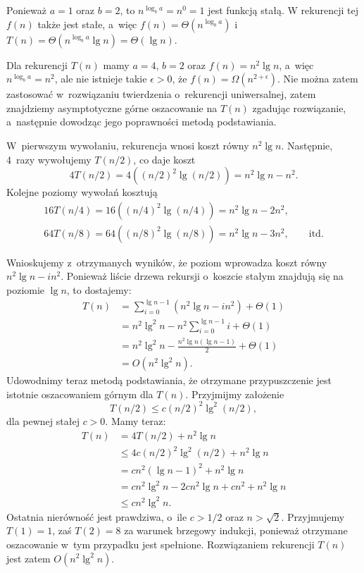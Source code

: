 \exercise %
Ponieważ $a=1$ oraz $b=2$, to $n^{\log_ba}=n^0=1$ jest funkcją stałą. W rekurencji tej $f(n)$ także jest stałe, a~więc $f(n)=\Theta(n^{\log_ba})$ i~$T(n)=\Theta(n^{\log_ba}\lg n)=\Theta(\lg n)$.

\exercise %
Dla rekurencji $T(n)$ mamy $a=4$, $b=2$ oraz $f(n)=n^2\lg n$, a~więc $n^{\log_ba}=n^2$, ale nie istnieje takie $\epsilon>0$, że $f(n)=\Omega(n^{2+\epsilon})$. Nie można zatem zastosować w~rozwiązaniu twierdzenia o~rekurencji uniwersalnej, zatem znajdziemy asymptotyczne górne oszacowanie na $T(n)$ zgadując rozwiązanie, a~następnie dowodząc jego poprawności metodą podstawiania.

W~pierwszym wywołaniu, rekurencja wnosi koszt równy $n^2\lg n$. Następnie, 4~razy wywołujemy $T(n/2)$, co daje koszt
\[
	4T(n/2) = 4((n/2)^2\lg(n/2)) = n^2\lg n-n^2.
\]
Kolejne poziomy wywołań kosztują
\begin{gather*}
	16T(n/4) = 16((n/4)^2\lg(n/4)) = n^2\lg n-2n^2, \qquad\phantom{\text{itd.}} \\
	64T(n/8) = 64((n/8)^2\lg(n/8)) = n^2\lg n-3n^2, \qquad\text{itd.}
\end{gather*}

Wnioskujemy z~otrzymanych wyników, że  poziom wprowadza koszt równy $n^2\lg n-in^2$. Ponieważ liście drzewa rekursji o~koszcie stałym znajdują się na poziomie $\lg n$, to dostajemy:
\begin{align*}
	T(n) &= \sum_{i=0}^{\lg n-1}(n^2\lg n-in^2)+\Theta(1) \\
	&= n^2\lg^2n-n^2\sum_{i=0}^{\lg n-1}i+\Theta(1) \\[1mm]
	&= n^2\lg^2n-\frac{n^2\lg n(\lg n-1)}{2}+\Theta(1) \\[1mm]
	&= O(n^2\lg^2n).
\end{align*}
Udowodnimy teraz metodą podstawiania, że otrzymane przypuszczenie jest istotnie oszacowaniem górnym dla $T(n)$. Przyjmijmy założenie
\[
	T(n/2) \le c(n/2)^2\lg^2(n/2),
\]
dla pewnej stałej $c>0$. Mamy teraz:
\begin{align*}
	T(n) &= 4T(n/2)+n^2\lg n \\
	&\le 4c(n/2)^2\lg^2(n/2)+n^2\lg n \\
	&= cn^2(\lg n-1)^2+n^2\lg n \\
	&= cn^2\lg^2n-2cn^2\lg n+cn^2+n^2\lg n \\
	&\le cn^2\lg^2n.
\end{align*}
Ostatnia nierówność jest prawdziwa, o~ile $c>1/2$ oraz $n>\sqrt{2}$. Przyjmujemy $T(1)=1$, zaś $T(2)=8$ za warunek brzegowy indukcji, ponieważ otrzymane oszacowanie w~tym przypadku jest spełnione. Rozwiązaniem rekurencji $T(n)$ jest zatem $O(n^2\lg^2n)$.


